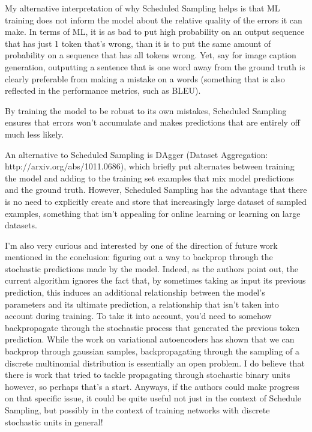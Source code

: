 \documentclass[UTF8,10pt,a4paper]{ctexbook}
\begin{document}
My alternative interpretation of why Scheduled Sampling helps is that ML training does not inform the model about the relative quality of the errors it can make. In terms of ML, it is as bad to put high probability on an output sequence that has just 1 token that's wrong, than it is to put the same amount of probability on a sequence that has all tokens wrong. Yet, say for image caption generation, outputting a sentence that is one word away from the ground truth is clearly preferable from making a mistake on a words (something that is also reflected in the performance metrics, such as BLEU). 

By training the model to be robust to its own mistakes, Scheduled Sampling ensures that errors won't accumulate and makes predictions that are entirely off much less likely.

An alternative to Scheduled Sampling is DAgger (Dataset Aggregation: http://arxiv.org/abs/1011.0686), which briefly put alternates between training the model and adding to the training set examples that mix model predictions and the ground truth. However, Scheduled Sampling has the advantage that there is no need to explicitly create and store that increasingly large dataset of sampled examples, something that isn't appealing for online learning or learning on large datasets.

I'm also very curious and interested by one of the direction of future work mentioned in the conclusion: figuring out a way to backprop through the stochastic predictions made by the model. Indeed, as the authors point out, the current algorithm ignores the fact that, by sometimes taking as input its previous prediction, this induces an additional relationship between the model's parameters and its ultimate prediction, a relationship that isn't taken into account during training. To take it into account, you'd need to somehow backpropagate through the stochastic process that generated the previous token prediction. While the work on variational autoencoders has shown that we can backprop through gaussian samples, backpropagating through the sampling of a discrete multinomial distribution is essentially an open problem. I do believe that there is work that tried to tackle propagating through stochastic binary units however, so perhaps that's a start. Anyways, if the authors could make progress on that specific issue, it could be quite useful not just in the context of Schedule Sampling, but possibly in the context of training networks with discrete stochastic units in general!
\end{document}
